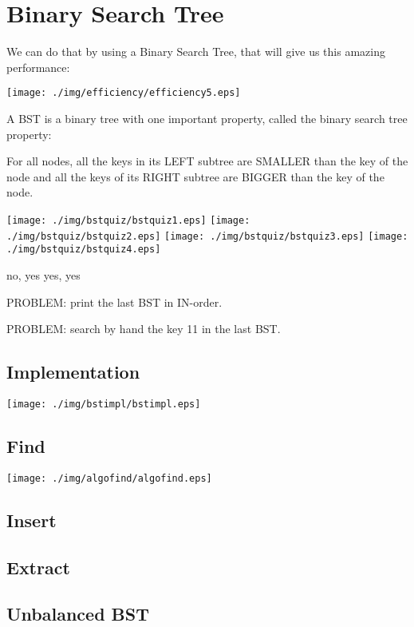 \documentclass[a4paper, 9pt]{extarticle}
\begin{document}
\newpage

\section{Binary Search Tree}

We can do that by using a Binary Search Tree, that will give us this amazing
performance:

\begin{center}
  \texttt{[image: ./img/efficiency/efficiency5.eps]}
\end{center}

A BST is a binary tree with one important property, called the binary search tree property:

\begin{blackboard}
  For all nodes,
        all the keys in its LEFT  subtree are SMALLER than the key of the node
    and all the keys of its RIGHT subtree are BIGGER  than the key of the node.
\end{blackboard}

\begin{center}
  \texttt{[image: ./img/bstquiz/bstquiz1.eps]}
  \texttt{[image: ./img/bstquiz/bstquiz2.eps]}
  \texttt{[image: ./img/bstquiz/bstquiz3.eps]}
  \texttt{[image: ./img/bstquiz/bstquiz4.eps]}
\end{center}

\begin{blackboard}
  no, yes
  yes, yes
\end{blackboard}

PROBLEM: print the last BST in IN-order.

PROBLEM: search by hand the key 11 in the last BST.

\subsection{Implementation}

\begin{center}
  \texttt{[image: ./img/bstimpl/bstimpl.eps]}
\end{center}

\subsection{Find}

\begin{center}
  \texttt{[image: ./img/algofind/algofind.eps]}
\end{center}

\begin{multicols}{2}
\columnbreak
\end{multicols}


\subsection{Insert}

\subsection{Extract}

\subsection{Unbalanced BST}
\end{document}
